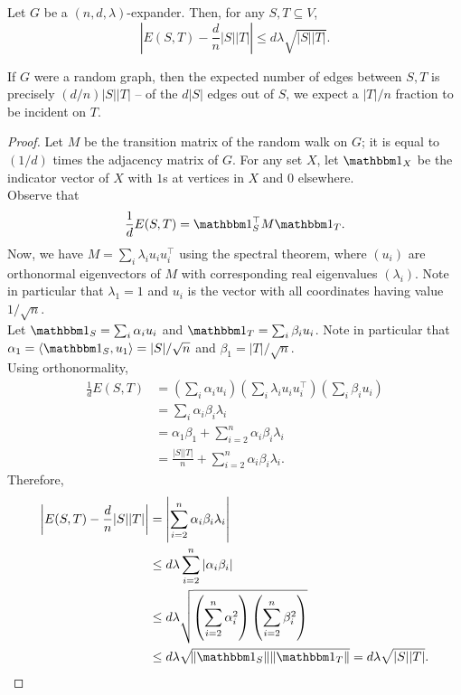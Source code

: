 			\begin{ftheo}
				Let $G$ be a $(n,d,\lambda)$-expander. Then, for any $S,T \subseteq V$,
				\[ \left| E(S,T) - \frac{d}{n}|S||T| \right| \le d\lambda \sqrt{|S||T|}. \]
			\end{ftheo}
			If $G$ were a random graph, then the expected number of edges between $S,T$ is precisely $(d/n)|S||T|$ -- of the $d|S|$ edges out of $S$, we expect a $|T|/n$ fraction to be incident on $T$.\\
			\begin{proof}
				Let $M$ be the transition matrix of the random walk on $G$; it is equal to $(1/d)$ times the adjacency matrix of $G$. For any set $X$, let $\indic_X$ be the indicator vector of $X$ with $1$s at vertices in $X$ and $0$ elsewhere.\\
				Observe that
				\[ \frac{1}{d}E(S,T) = \indic_S^\top M \indic_T. \]
				Now, we have $M = \sum_i \lambda_i u_i u_i^\top$ using the spectral theorem, where $(u_i)$ are orthonormal eigenvectors of $M$ with corresponding real eigenvalues $(\lambda_i)$. Note in particular that $\lambda_1 = 1$ and $u_i$ is the vector with all coordinates having value $1/\sqrt{n}$.\\
				Let $\indic_S = \sum_i \alpha_i u_i$ and $\indic_T = \sum_i \beta_i u_i$. Note in particular that $\alpha_1 = \langle\indic_S,u_1\rangle = |S|/\sqrt{n}$ and $\beta_1 = |T|/\sqrt{n}$. \\
				Using orthonormality,
				\begin{align*}
					\frac{1}{d}E(S,T) &= \left( \sum_i \alpha_i u_i \right) \left( \sum_i \lambda_i u_iu_i^\top \right) \left( \sum_i \beta_i u_i \right) \\
						&= \sum_i \alpha_i \beta_i \lambda_i \\
						&= \alpha_1\beta_1 + \sum_{i=2}^n \alpha_i\beta_i \lambda_i \\
						&= \frac{|S||T|}{n} + \sum_{i=2}^n \alpha_i \beta_i \lambda_i.
				\end{align*}
				Therefore,
				\begin{align*}
					\left| E(S,T) - \frac{d}{n} |S||T| \right| &= \left|\sum_{i=2}^n \alpha_i \beta_i \lambda_i \right| \\
						&\le d\lambda \sum_{i=2}^n \left|\alpha_i \beta_i \right| \\
						&\le d\lambda \sqrt{ \left( \sum_{i=2}^n \alpha_i^2 \right) \left( \sum_{i=2}^n \beta_i^2 \right) } \\
						&\le d\lambda \sqrt{\norm{\indic_S}\norm{\indic_T}} = d\lambda\sqrt{|S||T|}.
				\end{align*}


\end{proof}
